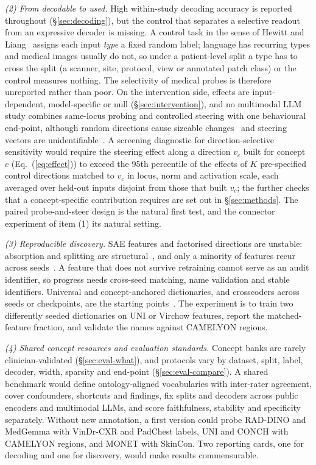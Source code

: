 \textit{(2) From decodable to used.} High within-study decoding accuracy is reported throughout
(\S\ref{sec:decoding}), but the control that separates a selective readout from an expressive decoder
is missing. A control task in the sense of Hewitt and Liang~\cite{hewitt2019designing} assigns each
input \emph{type} a fixed random label; language has recurring types and medical images usually do not,
so under a patient-level split a type has to cross the split (a scanner, site, protocol, view or
annotated patch class) or the control measures nothing. The selectivity of medical probes is therefore
unreported rather than poor. On the intervention side, effects are input-dependent, model-specific or
null (\S\ref{sec:intervention}), and no multimodal LLM study combines same-locus probing and
controlled steering with one behavioural end-point, although random directions cause sizeable
changes~\cite{korznikov2025the} and steering vectors are unidentifiable~\cite{venkatesh2026nonident}.
A screening diagnostic for direction-selective sensitivity would require the steering effect along a
direction $v_c$ built for concept $c$ (Eq.~(\ref{eq:effect})) to exceed the 95th percentile of the
effects of $K$ pre-specified control directions matched to $v_c$ in locus, norm and activation scale,
each averaged over held-out inputs disjoint from those that built $v_c$; the further checks that a
concept-specific contribution requires are set out in \S\ref{sec:methods}. The paired probe-and-steer
design is the natural first test, and the connector experiment of item (1) its natural setting.

\textit{(3) Reproducible discovery.} SAE features and factorised directions are unstable: absorption and
splitting are structural~\cite{chanin2024a}, and only a minority of features recur across
seeds~\cite{paulo2025sparse,sainsbury2026sparse}. A feature that does not survive retraining cannot serve
as an audit identifier, so progress needs cross-seed matching, name validation and stable identifiers.
Universal and concept-anchored dictionaries, and crosscoders across seeds or checkpoints, are the
starting points~\cite{thasarathan2025universal,nasirisarvi2025sparc,minder2025overcoming}. The experiment
is to train two differently seeded dictionaries on UNI or Virchow features, report the matched-feature
fraction, and validate the names against CAMELYON regions.

\textit{(4) Shared concept resources and evaluation standards.} Concept banks are rarely
clinician-validated (\S\ref{sec:eval-what}), and protocols vary by dataset, split, label, decoder,
width, sparsity and end-point (\S\ref{sec:eval-compare}). A shared benchmark would define
ontology-aligned vocabularies with inter-rater agreement, cover confounders, shortcuts and findings,
fix splits and decoders across public encoders and multimodal LLMs, and score faithfulness, stability
and specificity separately. Without new annotation, a first version could probe RAD-DINO and MedGemma
with VinDr-CXR and PadChest labels, UNI and CONCH with CAMELYON regions, and MONET with SkinCon. Two
reporting cards, one for decoding and one for discovery, would make results commensurable.

